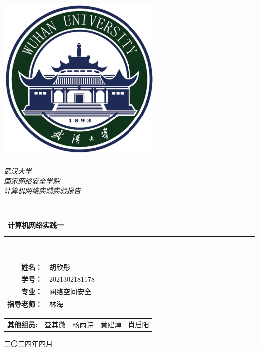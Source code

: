 \documentclass{whureport}
\begin{document}
\begin{titlepage}
\pagestyle{empty}
	\newcommand{\HRule}{\rule{\linewidth}{0.5mm}}
 \center
	\includegraphics[width=8cm]{logo.pdf}\\[1cm] 
	\center 
	\quad\\[0.5cm]
	\textsl{\Huge 武汉大学 }\\[0.5cm] 
	\textsl{\huge 国家网络安全学院}\\[0.5cm] 
    \textsl{\LARGE 计算机网络实践实验报告}\\[0.5cm]

	\makeatletter
	\HRule \\[0.4cm]
	{ \LARGE \bfseries \ 计算机网络实践一}\\[0.4cm]
	\HRule \\[0.cm]
		\begin{center}

           \Large
            \begin{tabular}{r l}
            \textbf{姓名：} & 胡欣彤\\
            \textbf{学号：} & 2021302181178\\
            \textbf{专业：} & 网络空间安全\\
            \textbf{指导老师：} & 林海
            \end{tabular}
\begin{tabular}{c c c c c}
\textbf{其他组员:} & 查其微 & 杨雨诗 & 黄建焯 & 肖启阳
\end{tabular}
            
		\end{center}
	\makeatother
 
	{\large \textup{二〇二四年四月}}\\[2cm] 
	\vfill 
\end{titlepage}
\
\end{document}
